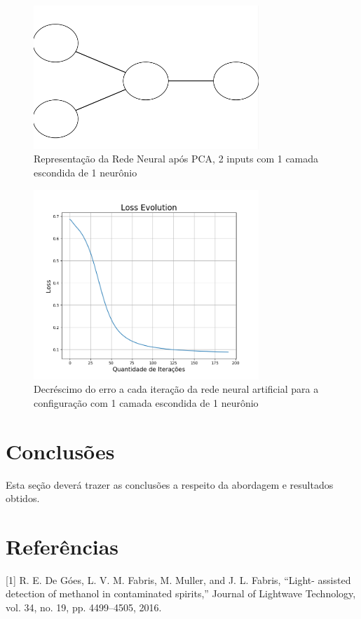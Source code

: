 \documentclass{article}
\begin{document}
\begin{figure}[ht]
\centering
\includegraphics[width=8.5cm]{rna_pca_1}
\caption{Representação da Rede Neural após PCA, 2 inputs com 1 camada escondida de 1 neurônio}
\label{rna_pca_1}
\end{figure}

\begin{figure}[ht]
\centering
\includegraphics[width=8.5cm]{rna_pca_1_loss}
\caption{Decréscimo do erro a cada iteração da rede neural artificial para a configuração com 1 camada escondida de 1 neurônio}
\label{rna_pca_1_loss}
\end{figure}

\section{Conclusões}
\vspace{1cm} Esta seção deverá trazer as conclusões a respeito da
abordagem e resultados obtidos. \vspace{2cm}

\section*{Referências}
\vspace{1cm} [1] R. E. De Góes, L. V. M. Fabris, M. Muller, and J. L. Fabris, “Light-
assisted detection of methanol in contaminated spirits,” Journal of
Lightwave Technology, vol. 34, no. 19, pp. 4499–4505, 2016.
\end{document}
